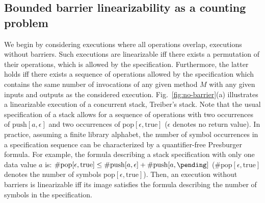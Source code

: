


\subsection{Bounded barrier linearizability as a counting problem}\label{sec:barriers}

We begin by considering executions where all operations overlap, \ie executions without barriers. Such executions are linearizable iff there exists a permutation of their operations, which is allowed by the specification. Furthermore, the latter holds iff there exists a sequence of operations allowed by the specification which contains the same number of invocations of any given method $M$ with any given inputs and outputs as the considered execution. 
Fig.~\ref{fig:no-barrier}(a) illustrates a linearizable execution of a concurrent stack, \eg Treiber's stack. Note that the usual specification of a stack allows for a sequence of operations with two occurrences of $\mathrm{push}[a,\epsilon]$ and two occurrences of $\mathrm{pop}[\epsilon,\mathrm{true}]$ ($\epsilon$ denotes no return value). In practice, assuming a finite library alphabet, the number of symbol occurrences in a specification sequence can be characterized by a quantifier-free Presburger formula. For example, the formula describing a stack specification with only one data value $a$ is: 
$
\#\mathrm{pop}[\epsilon,\mathrm{true}]\leq  \#\mathrm{push}[a,\epsilon] +  \#\mathrm{push}[a,\pending]
$ ($\#\mathrm{pop}[\epsilon,\mathrm{true}]$ denotes the number of symbols $\mathrm{pop}[\epsilon,\mathrm{true}]$). Then, an execution without barriers is linearizable iff its image satisfies the formula describing the number of symbols in the specification.


